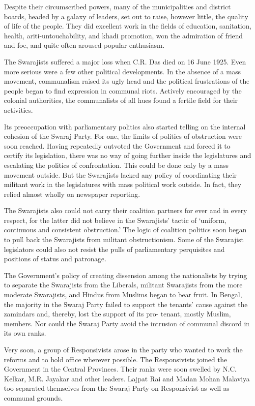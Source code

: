 Despite their circumscribed powers, many of the municipalities and district boards, headed by a galaxy of leaders, set out to raise, however little, the quality of life of the people. They did excellent work in the fields of education, sanitation, health, ariti-untouchability, and khadi promotion, won the admiration of friend and foe, and quite often aroused popular enthusiasm.

The Swarajists suffered a major loss when C.R. Das died on 16 June 1925. Even more serious were a few other political developments. In the absence of a mass movement, communalism raised its ugly head and the political frustrations of the people began to find expression in communal riots. Actively encouraged by the colonial authorities, the communalists of all hues found a fertile field for their activities.

Its preoccupation with parliamentary politics also started telling on the internal cohesion of the Swaraj Party. For one, the limits of politics of obstruction were soon reached. Having repeatedly outvoted the Government and forced it to certify its legislation, there was no way of going further inside the legislatures and escalating the politics of confrontation. This could be done only by a mass movement outside. But the Swarajists lacked any policy of coordinating their militant work in the legislatures with mass political work outside. In fact, they relied almost wholly on newspaper reporting.

The Swarajists also could not carry their coalition partners for ever and in every respect, for the latter did not believe in the Swarajists' tactic of `uniform, continuous and consistent obstruction.' The logic of coalition politics soon began to pull back the Swarajists from militant obstructionism. Some of the Swarajist legislators could also not resist the pulls of parliamentary perquisites and positions of status and patronage.

The Government's policy of creating dissension among the nationalists by trying to separate the Swarajists from the Liberals, militant Swarajists from the more moderate Swarajists, and Hindus from Muslims began to bear fruit. In Bengal, the majority in the Swaraj Party failed to support the tenants' cause against the zamindars and, thereby, lost the support of its pro- tenant, mostly Muslim, members. Nor could the Swaraj Party avoid the intrusion of communal discord in its own ranks.

Very soon, a group of Responsivists arose in the party who wanted to work the reforms and to hold office wherever possible. The Responsivists joined the Government in the Central Provinces. Their ranks were soon swelled by N.C. Kelkar, M.R. Jayakar and other leaders. Lajpat Rai and Madan Mohan Malaviya too separated themselves from the Swaraj Party on Responsivist as well as communal grounds.

